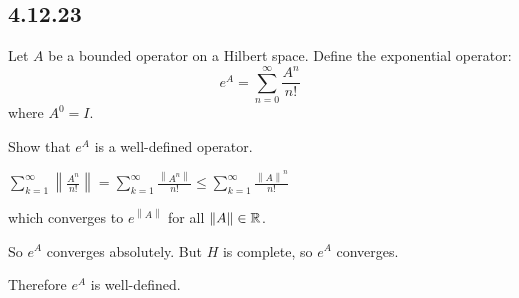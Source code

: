 \documentclass[letterpaper,12pt,fleqn]{article}
\newcommand{\norm}[1]{\left\|#1\right\|}
\begin{document}
\subsection*{4.12.23}

Let $A$ be a bounded operator on a Hilbert space. Define the exponential
operator:
\[e^A=\sum_{n=0}^{\infty}\frac{A^n}{n!}\]
where $A^0=I$.

Show that $e^A$ is a well-defined operator.

$\sum_{k=1}^{\infty}\norm{\frac{A^n}{n!}}=
\sum_{k=1}^{\infty}\frac{\norm{A^n}}{n!}\le
\sum_{k=1}^{\infty}\frac{\norm{A}^n}{n!}$

which converges to $e^{\norm{A}}$ for all $\norm{A}\in\R$.

So $e^A$ converges absolutely. But $H$ is complete, so $e^A$ converges.

Therefore $e^A$ is well-defined.
\end{document}
